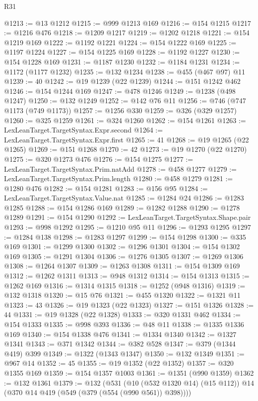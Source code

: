 \begin{lexlean}{R31}
\begin{coremodule}
@1213 := @13 @1212
@1215 := @999 @1213 @169
@1216 := @154 @1215
@1217 := @1216 @476
@1218 := @1209 @1217
@1219 := @1202 @1218
@1221 := @154 @1219 @169
@1222 := @1192 @1221
@1224 := @154 @1222 @169
@1225 := @1197 @1224
@1227 := @154 @1225 @169
@1228 := @1192 @1227
@1230 := @154 @1228 @169
@1231 := @1187 @1230
@1232 := @1184 @1231
@1234 := @1172 (@1177 @1232)
@1235 := @132 @1234
@1238 := @455 (@467 @97) @11
@1239 := 40
@1242 := @19 @1239 (@22 @1239)
@1244 := @151 @1242 @462
@1246 := @154 @1244 @169
@1247 := @478 @1246
@1249 := @1238 (@498 @1247)
@1250 := @132 @1249
@1252 := @142 @76 @11
@1256 := @746 (@747 @1173 (@749 @1173))
@1257 := @1256 @330
@1259 := @326 (@329 @1257)
@1260 := @325 @1259
@1261 := @324 @1260
@1262 := @154 @1261
@1263 := LexLeanTarget.TargetSyntax.Expr.second
@1264 := LexLeanTarget.TargetSyntax.Expr.first
@1265 := 41
@1268 := @19 @1265 (@22 @1265)
@1269 := @151 @1268
@1270 := 42
@1273 := @19 @1270 (@22 @1270)
@1275 := @320 @1273 @476
@1276 := @154 @1275
@1277 := LexLeanTarget.TargetSyntax.Prim.natAdd
@1278 := @458 @1277
@1279 := LexLeanTarget.TargetSyntax.Prim.length
@1280 := @458 @1279
@1281 := @1280 @476
@1282 := @154 @1281
@1283 := @156 @95
@1284 := LexLeanTarget.TargetSyntax.Value.nat
@1285 := @1284 @24
@1286 := @1283 @1285
@1288 := @154 @1286 @169
@1289 := @1282 @1288
@1290 := @1278 @1289
@1291 := @154 @1290
@1292 := LexLeanTarget.TargetSyntax.Shape.pair
@1293 := @998 @1292
@1295 := @1210 @95 @11
@1296 := @1293 @1295
@1297 := @1284 @138
@1298 := @1283 @1297
@1299 := @154 @1298
@1300 := @335 @169
@1301 := @1299 @1300
@1302 := @1296 @1301
@1304 := @154 @1302 @169
@1305 := @1291 @1304
@1306 := @1276 @1305
@1307 := @1269 @1306
@1308 := @1264 @1307
@1309 := @1263 @1308
@1311 := @154 @1309 @169
@1312 := @1262 @1311
@1313 := @948 @1312
@1314 := @154 @1313
@1315 := @1262 @169
@1316 := @1314 @1315
@1318 := @1252 (@948 @1316)
@1319 := @132 @1318
@1320 := @15 @76
@1321 := @455 @1320
@1322 := @1321 @11
@1323 := 43
@1326 := @19 @1323 (@22 @1323)
@1327 := @151 @1326
@1328 := 44
@1331 := @19 @1328 (@22 @1328)
@1333 := @320 @1331 @462
@1334 := @154 @1333
@1335 := @998 @393
@1336 := @48 @11
@1338 := @1335 @1336 @169
@1340 := @154 @1338 @476
@1341 := @1334 @1340
@1342 := @1327 @1341
@1343 := @371 @1342
@1344 := @382 @528
@1347 := @379 (@1344 @419) @399
@1349 := @1322 (@1343 @1347)
@1350 := @132 @1349
@1351 := @967 @14
@1352 := 45
@1355 := @19 @1352 (@22 @1352)
@1357 := @320 @1355 @169
@1359 := @154 @1357 @1003
@1361 := @1351 (@990 @1359)
@1362 := @132 @1361
@1379 := @132
    (@531
      (@10 (@532 @1320 @14) (@15 @112))
      @14
      (@370 @14 @419 (@549 (@379 (@554 (@990 @561)) @398))))

\end{coremodule}
\end{lexlean}
